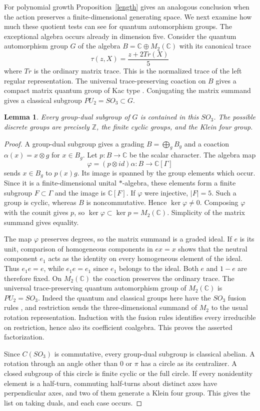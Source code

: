 \documentclass[11pt,a4paper]{article}
\newtheorem{lem}[thm]{Lemma}
\theoremstyle{remark}
\begin{document}
For polynomial growth Proposition~\ref{length} gives an analogous
conclusion when the action preserves a finite-dimensional generating
space. We next examine how much these quotient tests can see for quantum
automorphism groups. The exceptional algebra occurs already in dimension
five.
Consider the quantum automorphism group $G$ of the algebra
$B=\mathbb C\oplus M_2(\mathbb C)$ with its canonical trace
\[
 \tau(z,X)=\frac{z+2Tr(X)}5
\]
where $Tr$ is the ordinary matrix trace. This is the normalized trace of
the left regular representation. The universal trace-preserving coaction
on $B$ gives a compact matrix quantum group of Kac type \cite{generic}.
Conjugating the matrix summand gives a classical subgroup
$PU_2=SO_3\subset G$.

\begin{lem}\label{fiveorbit}
Every group-dual subgroup of $G$ is contained in this $SO_3$.
The possible discrete groups are precisely $\mathbb Z$, the finite
cyclic groups, and the Klein four group.
\end{lem}
\begin{proof}
A group-dual subgroup gives a grading $B=\bigoplus_g B_g$ and a coaction
$\alpha(x)=x\otimes g$ for $x\in B_g$. Let $p:B\to\mathbb C$ be the
scalar character. The algebra map
\[
 \varphi=(p\otimes id)\alpha:B\longrightarrow\mathbb C[\Gamma]
\]
sends $x\in B_g$ to $p(x)g$. Its image is spanned by the group elements
which occur. Since it is a finite-dimensional unital $*$-algebra, these
elements form a finite subgroup $F\subset\Gamma$ and the image is
$\mathbb C[F]$. If $\varphi$ were injective, $|F|=5$. Such a group is
cyclic, whereas $B$ is noncommutative. Hence $\ker\varphi\ne0$.
Composing $\varphi$ with the counit gives $p$, so
$\ker\varphi\subset\ker p=M_2(\mathbb C)$. Simplicity of the matrix
summand gives equality.

The map $\varphi$ preserves degrees, so the matrix summand is a graded
ideal. If $e$ is its unit, comparison of homogeneous components in
$ex=x$ shows that the neutral component $e_1$ acts as the identity
on every homogeneous element of the ideal. Thus $e_1e=e$, while
$e_1e=e_1$ since $e_1$ belongs to the ideal. Both $e$ and $1-e$ are
therefore fixed. On
$M_2(\mathbb C)$ the coaction preserves the ordinary trace. The universal
trace-preserving quantum automorphism group of $M_2(\mathbb C)$ is
$PU_2=SO_3$. Indeed the quantum and classical groups here have the
$SO_3$ fusion rules \cite{generic}, and restriction sends the
three-dimensional summand of $M_2$ to the usual rotation representation.
Induction with the fusion rules identifies every irreducible on
restriction, hence also its coefficient coalgebra. This proves the
asserted factorization.

Since $C(SO_3)$ is commutative, every group-dual subgroup is classical
abelian. A rotation through an angle other than $0$ or $\pi$ has a circle
as its centralizer. A closed
subgroup of this circle is finite cyclic or the full circle. If every
nonidentity element is a half-turn, commuting half-turns about distinct
axes have perpendicular axes, and two of them generate a Klein four
group. This gives the list on taking duals, and each case occurs.
\end{proof}
\end{document}
